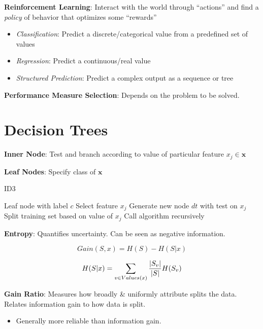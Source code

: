 \documentclass[10pt]{article}
\DeclarePairedDelimiter{\abs}{\lvert}{\rvert}
\begin{document}
\begin{multicols}{3}
  \textbf{Reinforcement Learning}: Interact with the world through ``actions'' and find a \textit{policy} of behavior that optimizes some ``rewards''

  \begin{itemize}
    \item \textit{Classification}: Predict a discrete/categorical value from a predefined set of values
    \item \textit{Regression}: Predict a continuous/real value
    \item \textit{Structured Prediction}: Predict a complex output as a sequence or tree
  \end{itemize}

  \noindent
  \textbf{Performance Measure Selection}: Depends on the problem to be solved.

  \section{Decision Trees}

  \textbf{Inner Node}: Test and branch according to value of particular feature ${x_j \in \mathbf{x}}$

  \noindent
  \textbf{Leaf Nodes}: Specify class of $\mathbf{x}$

  \begin{algorithm}[h]
    \caption{ID3}\label{alg:ID3}
    \begin{algorithmic}[1]
        \Return Leaf node with label $c$
      \EndIf
      \State Select feature $x_j$
      \State Generate new node $dt$ with test on $x_j$
      \State Split training set based on value of $x_j$
      \State Call algorithm recursively
    \end{algorithmic}
  \end{algorithm}

  \noindent
  \textbf{Entropy}: Quantifies uncertainty.  Can be seen as negative information.

  \[ Gain(S,x) = H(S) - H(S\vert x) \]

  \[ H(S\vert x) = \sum_{v\in Values(x)} \frac{\abs{S_v}}{\abs{S}} H(S_v) \]

  \noindent
  \textbf{Gain Ratio}: Measures how broadly \& uniformly attribute splits the data.  Relates information gain to how data is split.
  \begin{itemize}
    \item Generally more reliable than information gain.
  \end{itemize}


\end{multicols}
\end{document}
